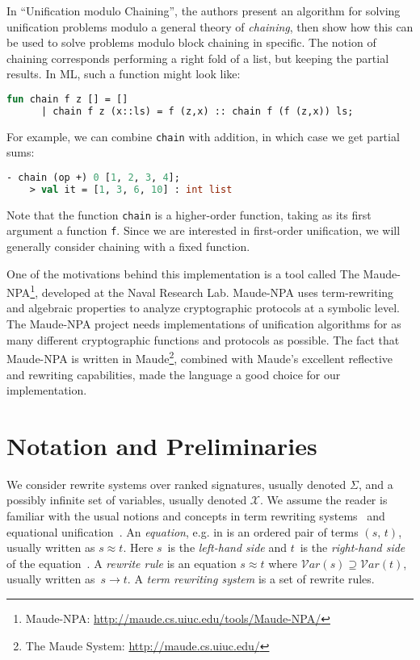 \documentclass[11pt]{article}
\newcommand{\X}{\mathcal{X}}
\newcommand{\Var}{\mathcal{V}\!ar}
\begin{document}
In ``Unification modulo Chaining'', the authors present an algorithm for
solving unification problems modulo a general theory of \emph{chaining}, then
show how this can be used to solve problems modulo block chaining in specific.
The notion of chaining corresponds performing a right fold of a list, but
keeping the partial results. In ML, such a function might look like:
\begin{lstlisting}[language=ML, style=smalllisting]
    fun chain f z [] = []
      | chain f z (x::ls) = f (z,x) :: chain f (f (z,x)) ls;
\end{lstlisting}
For example, we can combine \lstinline|chain| with addition, in which case we
get partial sums:
\begin{lstlisting}[language=ML, style=smalllisting]
    - chain (op +) 0 [1, 2, 3, 4];
    > val it = [1, 3, 6, 10] : int list
\end{lstlisting}
Note that the function \lstinline|chain| is a higher-order function, taking as
its first argument a function \lstinline|f|. Since we are interested in
first-order unification, we will generally consider chaining with a fixed
function.

One of the motivations behind this implementation is a tool called The
Maude-NPA\footnote{Maude-NPA: \url{http://maude.cs.uiuc.edu/tools/Maude-NPA/}},
developed at the Naval Research Lab. Maude-NPA uses term-rewriting and
algebraic properties to analyze cryptographic protocols at a symbolic level.
The Maude-NPA project needs implementations of unification algorithms for as
many different cryptographic functions and protocols as possible. The fact that
Maude-NPA is written in Maude\footnote{The Maude System:
\url{http://maude.cs.uiuc.edu/}}, combined with Maude's excellent reflective
and rewriting capabilities, made the language a good choice for our
implementation.

\section{Notation and Preliminaries}\label{section:notation}

We consider rewrite systems over ranked signatures, usually denoted $\Sigma$,
and a possibly infinite set of variables, usually denoted $\X$. We assume the
reader is familiar with the usual notions and concepts in term rewriting
systems~\cite{Term} and equational unification~\cite{BaaderSnyd-01}.  An
\emph{equation}, e.g. in \cite{Term} is an ordered pair of terms $(s, \, t)$,
usually written as $s \approx t$. Here $s$~is the \emph{left-hand side} and
$t$~is the \emph{right-hand side} of the equation~\cite{Term}. A \emph{rewrite
rule} is an equation $s \approx t$ where $\Var(s) \supseteq \Var(t)$, usually
written as~$s \to t$. A \emph{term rewriting system} is a set of rewrite rules.
\end{document}
